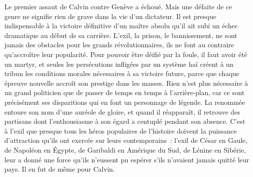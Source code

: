 \documentclass[french,twoside]{book} %
\begin{document}
\noindent Le premier assaut de Calvin contre Genève a échoué. Mais une défaite de ce genre ne signifie rien de grave dans la vie d’un dictateur. Il est presque indispensable à la victoire définitive d’un maître absolu qu’il ait subi un échec dramatique au début de sa carrière. L’exil, la prison, le bannissement, ne sont jamais des obstacles pour les grands révolutionnaires, ils ne font au contraire qu’accroître leur popularité. Pour pouvoir être déifié par la foule, il faut avoir été un martyr, et seules les persécutions infligées par un système haï créent à un tribun les conditions morales nécessaires à sa victoire future, parce que chaque épreuve nouvelle accroît son prestige dans les masses. Rien n’est plus nécessaire à un grand politicien que de passer de temps en temps à l’arrière-plan, car ce sont précisément ses disparitions qui en font un personnage de légende. La renommée entoure son nom d’une auréole de gloire, et quand il réapparaît, il retrouve des partisans dont l’enthousiasme à son égard a centuplé pendant son absence. C’est à l’exil que presque tous les héros populaires de l’histoire doivent la puissance d’attraction qu’ils ont exercée sur leurs contemporains : l’exil de César en Gaule, de Napoléon en Égypte, de Garibaldi en Amérique du Sud, de Lénine en Sibérie, leur a donné une force qu’ils n’eussent pu espérer s’ils n’avaient jamais quitté leur pays. Il en fut de même pour Calvin.\par
\end{document}
